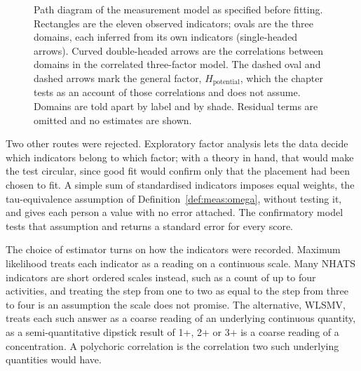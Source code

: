 \begin{figure}[htbp]
\centering

\caption{Path diagram of the measurement model as specified before fitting. Rectangles are the eleven observed indicators; ovals are the three domains, each inferred from its own indicators (single-headed arrows). Curved double-headed arrows are the correlations between domains in the correlated three-factor model. The dashed oval and dashed arrows mark the general factor, $H_{\text{potential}}$, which the chapter tests as an account of those correlations and does not assume. Domains are told apart by label and by shade. Residual terms are omitted and no estimates are shown.}
\label{fig:anal-path}
\end{figure}

Two other routes were rejected. Exploratory factor analysis lets the data decide which indicators belong to which factor; with a theory in hand, that would make the test circular, since good fit would confirm only that the placement had been chosen to fit. A simple sum of standardised indicators imposes equal weights, the tau-equivalence assumption of Definition~\ref{def:meas:omega}, without testing it, and gives each person a value with no error attached. The confirmatory model tests that assumption and returns a standard error for every score.

The choice of estimator turns on how the indicators were recorded. Maximum likelihood treats each indicator as a reading on a continuous scale. Many NHATS indicators are short ordered scales instead, such as a count of up to four activities, and treating the step from one to two as equal to the step from three to four is an assumption the scale does not promise. The alternative, WLSMV, treats each such answer as a coarse reading of an underlying continuous quantity, as a semi-quantitative dipstick result of 1+, 2+ or 3+ is a coarse reading of a concentration. A polychoric correlation is the correlation two such underlying quantities would have.

